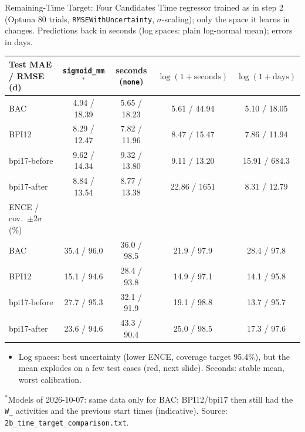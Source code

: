 \documentclass[aspectratio=169]{beamer} %
\begin{document}
\begin{frame}{Remaining-Time Target: Four Candidates}
  \scriptsize
  Time regressor trained as in step 2 (Optuna 80 trials, \texttt{RMSEWithUncertainty}, $\sigma$-scaling); only the
  space it learns in changes. Predictions back in seconds (log spaces: plain log-normal \alert{mean});
  errors in \alert{days}.
  \begin{center}\tiny\setlength{\tabcolsep}{4pt}\setlength{\aboverulesep}{0pt}\setlength{\belowrulesep}{1pt}
  \begin{tabular}{lcccc}
    \toprule
    Test MAE / RMSE (d) & \texttt{sigmoid\_mm}$^{*}$ & seconds (\texttt{none}) & $\log(1+\text{seconds})$ & $\log(1+\text{days})$ \\
    \midrule
    BAC          & 4.94 / 18.39 & 5.65 / 18.23 & 5.61 / \alert{44.94}   & 5.10 / 18.05 \\
    BPI12        & 8.29 / 12.47 & 7.82 / 11.96 & 8.47 / 15.47           & 7.86 / 11.94 \\
    bpi17-before & 9.62 / 14.34 & 9.32 / 13.80 & 9.11 / 13.20           & \alert{15.91 / 684.3} \\
    bpi17-after  & 8.84 / 13.54 & 8.77 / 13.38 & \alert{22.86 / 1651}   & 8.31 / 12.79 \\
    \midrule
    ENCE / cov.\ $\pm2\sigma$ (\%) & & & & \\
    \midrule
    BAC          & 35.4 / 96.0 & 36.0 / 98.5 & 21.9 / 97.9 & 28.4 / 97.8 \\
    BPI12        & 15.1 / 94.6 & 28.4 / 93.8 & 14.9 / 97.1 & 14.1 / 95.8 \\
    bpi17-before & 27.7 / 95.3 & 32.1 / 91.9 & 19.1 / 98.8 & 13.7 / 95.7 \\
    bpi17-after  & 23.6 / 94.6 & 43.3 / 90.4 & 25.0 / 98.5 & 17.3 / 97.6 \\
    \bottomrule
  \end{tabular}
  \end{center}
  \vspace{-0.2cm}
  \begin{itemize}
    \item Log spaces: best uncertainty (lower ENCE, coverage target 95.4\%), but the mean \alert{explodes} on a
      few test cases (red, next slide). Seconds: stable mean, worst calibration.
  \end{itemize}
  {\tiny $^{*}$Models of 2026-10-07: same data only for BAC; BPI12/bpi17 then still had the \texttt{W\_}
  activities and the previous start times (indicative). Source: \texttt{2b\_time\_target\_comparison.txt}.}
\end{frame}
\end{document}
